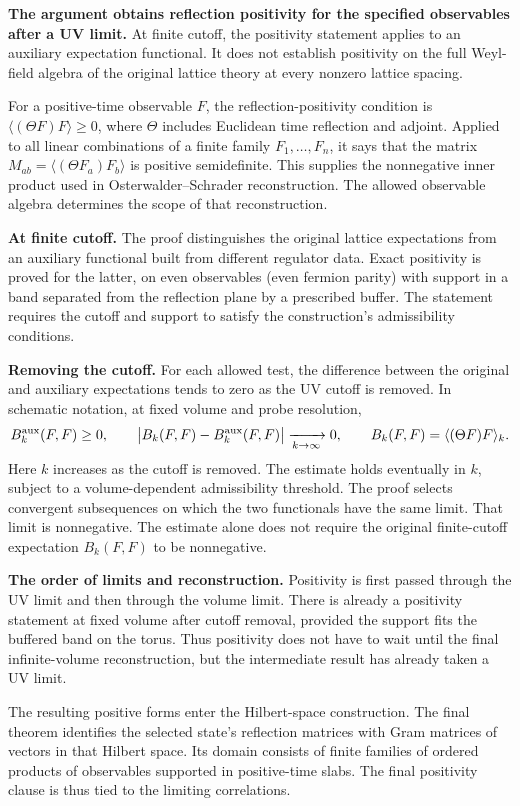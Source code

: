 \documentclass[11pt]{article}
\begin{document}
\textbf{The argument obtains reflection positivity for the specified observables
after a UV limit.}
At finite cutoff, the positivity statement applies to an auxiliary expectation
functional. It does not establish positivity on the full Weyl-field algebra
of the original lattice theory at every nonzero lattice spacing.

For a positive-time observable $F$, the reflection-positivity condition is
$\langle(\Theta F)F\rangle\geq0$, where $\Theta$ includes Euclidean time
reflection and adjoint. Applied to all linear combinations of a finite family
$F_1,\ldots,F_n$, it says that the matrix
$M_{ab}=\langle(\Theta F_a)F_b\rangle$ is positive semidefinite.
This supplies the nonnegative inner product used in
Osterwalder--Schrader reconstruction. The allowed observable algebra
determines the scope of that reconstruction.

\textbf{At finite cutoff.}
The proof distinguishes the original lattice expectations from an auxiliary
functional built from different regulator data. Exact positivity is proved
for the latter, on even observables (even fermion parity) with support in a
band separated from the reflection plane by a prescribed buffer. The
statement requires the cutoff and support to satisfy the construction's
admissibility conditions.

\textbf{Removing the cutoff.}
For each allowed test, the difference between the original and auxiliary
expectations tends to zero as the UV cutoff is removed. In schematic notation,
at fixed volume and probe resolution,
\[
 B_k^{\rm aux}(F,F)\geq0,\qquad
 \bigl|B_k(F,F)-B_k^{\rm aux}(F,F)\bigr|
 \xrightarrow[k\to\infty]{}0,
 \qquad B_k(F,F)=\langle(\Theta F)F\rangle_k.
\]
Here $k$ increases as the cutoff is removed. The estimate holds eventually in $k$, subject
to a volume-dependent admissibility threshold. The proof selects convergent
subsequences on which the two functionals have the same limit. That limit is
nonnegative. The estimate alone does not require the original finite-cutoff
expectation $B_k(F,F)$ to be nonnegative.

\textbf{The order of limits and reconstruction.}
Positivity is first passed through the UV limit and then through the volume
limit. There is already a positivity statement at fixed volume after cutoff
removal, provided the support fits the buffered band on the torus. Thus
positivity does not have to wait until the final infinite-volume
reconstruction, but the intermediate result has already taken a UV limit.

The resulting positive forms enter the Hilbert-space construction. The final
theorem identifies the selected state's reflection matrices with Gram matrices
of vectors in that Hilbert space. Its domain consists of finite families of
ordered products of observables supported in positive-time slabs. The final
positivity clause is thus tied to the limiting correlations.
\end{document}
